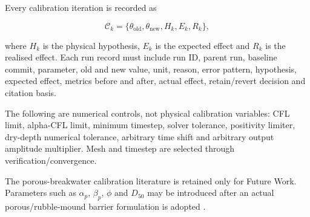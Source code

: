 Every calibration iteration is recorded as

\begin{equation}
\label{eq:calibration-audit-record}
\mathcal C_k
=
\{
\theta_{\mathrm{old}},
\theta_{\mathrm{new}},
H_k,
E_k,
R_k
\},
\end{equation}

where \(H_k\) is the physical hypothesis, \(E_k\) is the expected effect and \(R_k\) is the realised effect. Each run record must include run ID, parent run, baseline commit, parameter, old and new value, unit, reason, error pattern, hypothesis, expected effect, metrics before and after, actual effect, retain/revert decision and citation basis.

The following are numerical controls, not physical calibration variables: CFL limit, alpha-CFL limit, minimum timestep, solver tolerance, positivity limiter, dry-depth numerical tolerance, arbitrary time shift and arbitrary output amplitude multiplier. Mesh and timestep are selected through verification/convergence.

The porous-breakwater calibration literature is retained only for Future Work. Parameters such as \(\alpha_p\), \(\beta_p\), \(\phi\) and \(D_{50}\) may be introduced after an actual porous/rubble-mound barrier formulation is adopted \autocite{deljesus2012porous}.
